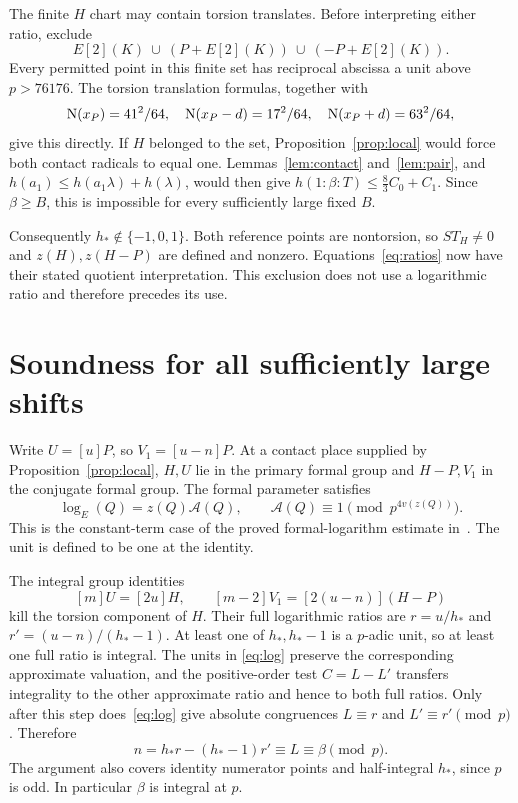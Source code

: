 \documentclass[11pt,a4paper]{article}
\begin{document}
The finite $H$ chart may contain torsion translates. Before interpreting
either ratio, exclude
\[
                  E[2](K)\ \cup\ (P+E[2](K))\ \cup\ (-P+E[2](K)).
\]
Every permitted point in this finite set has reciprocal abscissa a unit
above $p>76176$. The torsion translation formulas, together with
\[
 \operatorname{N}(x_P)=41^2/64,\quad
 \operatorname{N}(x_P-d)=17^2/64,\quad \operatorname{N}(x_P+d)=63^2/64,
\]
give this directly. If $H$ belonged to the set, Proposition~\ref{prop:local}
would force both contact radicals to equal one. Lemmas~\ref{lem:contact}
and~\ref{lem:pair}, and $h(a_1)\le h(a_1\lambda)+h(\lambda)$, would
then give $h(1:\beta:T)\le\frac83C_0+C_1$. Since $\beta\ge B$, this is
impossible for every sufficiently large fixed $B$.

Consequently $h_*\notin\{-1,0,1\}$. Both reference points are
nontorsion, so $S T_H\ne0$ and $z(H),z(H-P)$ are defined and nonzero.
Equations~\eqref{eq:ratios} now have their stated quotient interpretation.
This exclusion does not use a logarithmic ratio and therefore precedes
its use.

\section{Soundness for all sufficiently large shifts}

Write $U=[u]P$, so $V_1=[u-n]P$. At a contact place supplied by
Proposition~\ref{prop:local}, $H,U$ lie in the primary formal group
and $H-P,V_1$ in the conjugate formal group. The formal parameter satisfies
\begin{equation}\label{eq:log}
 \log_E(Q)=z(Q)\mathcal A(Q),\qquad
 \mathcal A(Q)\equiv1\pmod{p^{4v(z(Q))}}.
\end{equation}
This is the constant-term case of the proved formal-logarithm estimate
in~\cite{Logs}. The unit is defined to be one at the identity.

The integral group identities
\[
                [m]U=[2u]H,\qquad
                [m-2]V_1=[2(u-n)](H-P)
\]
kill the torsion component of $H$. Their full logarithmic ratios are
$r=u/h_*$ and $r'=(u-n)/(h_*-1)$. At least one of $h_*,h_*-1$ is a
$p$-adic unit, so at least one full ratio is integral. The units in
\eqref{eq:log} preserve the corresponding approximate valuation, and
the positive-order test $C=L-L'$ transfers integrality to the other
approximate ratio and hence to both full ratios.
Only after this step does~\eqref{eq:log} give absolute congruences
$L\equiv r$ and $L'\equiv r'\pmod p$. Therefore
\[
 n=h_*r-(h_*-1)r'\equiv L\equiv\beta\pmod p.
\]
The argument also covers identity numerator points and half-integral
$h_*$, since $p$ is odd. In particular $\beta$ is integral at $p$.
\end{document}

